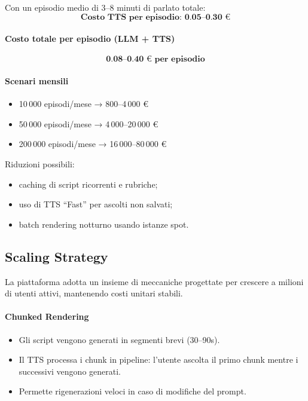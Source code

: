 \documentclass[11pt,a4paper]{article}
\begin{document}
Con un episodio medio di 3--8 minuti di parlato totale:
\[
\textbf{Costo TTS per episodio: 0.05--0.30 €}
\]

\paragraph{Costo totale per episodio (LLM + TTS)}

\[
\textbf{0.08--0.40 € per episodio}
\]

\paragraph{Scenari mensili}

\begin{itemize}
    \item 10\,000 episodi/mese → 800--4\,000 €
    \item 50\,000 episodi/mese → 4\,000--20\,000 €
    \item 200\,000 episodi/mese → 16\,000--80\,000 €
\end{itemize}

Riduzioni possibili:
\begin{itemize}
    \item caching di script ricorrenti e rubriche;
    \item uso di TTS ``Fast'' per ascolti non salvati;
    \item batch rendering notturno usando istanze spot.
\end{itemize}


\subsection{Scaling Strategy}

La piattaforma adotta un insieme di meccaniche progettate per crescere a milioni di utenti attivi, mantenendo costi unitari stabili.

\paragraph{Chunked Rendering}
\begin{itemize}
    \item Gli script vengono generati in segmenti brevi (30--90s).
    \item Il TTS processa i chunk in pipeline: l'utente ascolta il primo chunk mentre i successivi vengono generati.
    \item Permette rigenerazioni veloci in caso di modifiche del prompt.
\end{itemize}
\end{document}
